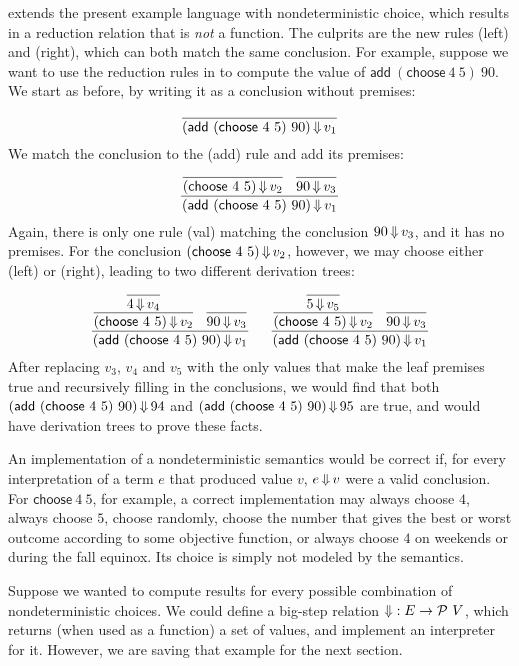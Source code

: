  extends the present example language with nondeterministic choice, which results in a reduction relation that is \emph{not} a function.
The culprits are the new rules (left) and (right), which can both match the same conclusion.
For example, suppose we want to use the reduction rules in  to compute the value of $\mathsf{add}~(\mathsf{choose}~4~5)~90$.
We start as before, by writing it as a conclusion without premises:
\begin{equation}
	\dfrac{}{(\mathsf{add}~(\mathsf{choose}~4~5)~90) \operatorname{\Downarrow} v_1}
\end{equation}
We match the conclusion to the (add) rule and add its premises:
\begin{equation}
	\dfrac{
		\dfrac{}{(\mathsf{choose}~4~5) \operatorname{\Downarrow} v_2}
		\;\;\,
		\dfrac{}{90 \operatorname{\Downarrow} v_3}
	}{(\mathsf{add}~(\mathsf{choose}~4~5)~90) \operatorname{\Downarrow} v_1}
\end{equation}
Again, there is only one rule (val) matching the conclusion $90 \operatorname{\Downarrow} v_3$, and it has no premises.
For the conclusion $(\mathsf{choose}~4~5) \operatorname{\Downarrow} v_2$, however, we may choose either (left) or (right), leading to two different derivation trees:
\begin{equation}
	\dfrac{
		\dfrac{
			\dfrac{}{4 \operatorname{\Downarrow} v_4}
		}{(\mathsf{choose}~4~5) \operatorname{\Downarrow} v_2}
		\;\;\,
		\dfrac{}{90 \operatorname{\Downarrow} v_3}
	}{(\mathsf{add}~(\mathsf{choose}~4~5)~90) \operatorname{\Downarrow} v_1}
	\;\;\,
	\;\;\,
	\dfrac{
		\dfrac{
			\dfrac{}{5 \operatorname{\Downarrow} v_5}
		}{(\mathsf{choose}~4~5) \operatorname{\Downarrow} v_2}
		\;\;\,
		\dfrac{}{90 \operatorname{\Downarrow} v_3}
	}{(\mathsf{add}~(\mathsf{choose}~4~5)~90) \operatorname{\Downarrow} v_1}
\end{equation}
After replacing $v_3$, $v_4$ and $v_5$ with the only values that make the leaf premises true and recursively filling in the conclusions, we would find that both $(\mathsf{add}~(\mathsf{choose}~4~5)~90) \operatorname{\Downarrow} 94$ and $(\mathsf{add}~(\mathsf{choose}~4~5)~90) \operatorname{\Downarrow} 95$ are true, and would have derivation trees to prove these facts.

An implementation of a nondeterministic semantics would be correct if, for every interpretation of a term $e$ that produced value $v$, $e \operatorname{\Downarrow} v$ were a valid conclusion.
For $\mathsf{choose}~4~5$, for example, a correct implementation may always choose $4$, always choose $5$, choose randomly, choose the number that gives the best or worst outcome according to some objective function, or always choose $4$ on weekends or during the fall equinox.
Its choice is simply not modeled by the semantics.

Suppose we wanted to compute results for every possible combination of nondeterministic choices.
We could define a big-step relation $\operatorname{\Downarrow} : E \to \mathcal{P}~V$, which returns (when used as a function) a set of values, and implement an interpreter for it.
However, we are saving that example for the next section.


